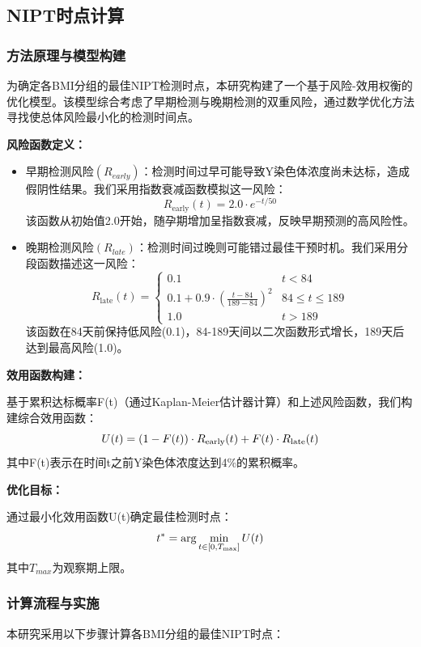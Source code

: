\documentclass{article}
\begin{document}
\subsection{\textbf{NIPT时点计算}}
\subsubsection{\textbf{方法原理与模型构建}}
为确定各BMI分组的最佳NIPT检测时点，本研究构建了一个基于风险-效用权衡的优化模型。该模型综合考虑了早期检测与晚期检测的双重风险，通过数学优化方法寻找使总体风险最小化的检测时间点。

\textbf{风险函数定义：}
\begin{itemize}
    \item 早期检测风险$(R_{early})$：检测时间过早可能导致Y染色体浓度尚未达标，造成假阴性结果。我们采用指数衰减函数模拟这一风险：
          \[
              R_{\text{early}}(t) = 2.0 \cdot e^{-t/50} \tag{1}
          \]
          该函数从初始值2.0开始，随孕期增加呈指数衰减，反映早期预测的高风险性。
    \item 晚期检测风险$(R_{late})$：检测时间过晚则可能错过最佳干预时机。我们采用分段函数描述这一风险：
          \[
              R_{\text{late}}(t) =
              \begin{cases}
                  0.1                                                  & t < 84             \\
                  0.1 + 0.9 \cdot \left( \frac{t-84}{189-84} \right)^2 & 84 \leq t \leq 189 \\
                  1.0                                                  & t > 189
              \end{cases} \tag{2}
          \]
          该函数在84天前保持低风险(0.1)，84-189天间以二次函数形式增长，189天后达到最高风险(1.0)。
\end{itemize}
\textbf{效用函数构建：}

基于累积达标概率F(t)（通过Kaplan-Meier估计器计算）和上述风险函数，我们构建综合效用函数：
\[
    U(t) = (1 - F(t)) \cdot R_{\text{early}}(t) + F(t) \cdot R_{\text{late}}(t)\\
\]
其中F(t)表示在时间t之前Y染色体浓度达到4\%的累积概率。

\textbf{优化目标：}

通过最小化效用函数U(t)确定最佳检测时点：
\[
    t^* = \arg\min_{t \in [0, T_{\text{max}}]} U(t) \\
\]
其中$T_{max}$为观察期上限。

\subsubsection{\textbf{计算流程与实施}}
本研究采用以下步骤计算各BMI分组的最佳NIPT时点：
\end{document}
